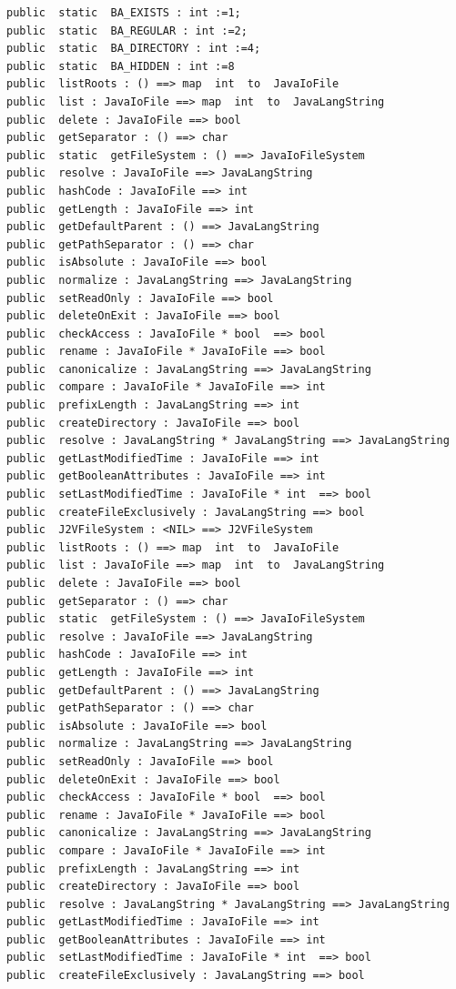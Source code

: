 \documentclass[\pformat,12pt]{article}
\begin{document}
\begin{small}
\begin{verbatim}
public  static  BA_EXISTS : int :=1;
public  static  BA_REGULAR : int :=2;
public  static  BA_DIRECTORY : int :=4;
public  static  BA_HIDDEN : int :=8
public  listRoots : () ==> map  int  to  JavaIoFile
public  list : JavaIoFile ==> map  int  to  JavaLangString
public  delete : JavaIoFile ==> bool
public  getSeparator : () ==> char
public  static  getFileSystem : () ==> JavaIoFileSystem
public  resolve : JavaIoFile ==> JavaLangString
public  hashCode : JavaIoFile ==> int
public  getLength : JavaIoFile ==> int
public  getDefaultParent : () ==> JavaLangString
public  getPathSeparator : () ==> char
public  isAbsolute : JavaIoFile ==> bool
public  normalize : JavaLangString ==> JavaLangString
public  setReadOnly : JavaIoFile ==> bool
public  deleteOnExit : JavaIoFile ==> bool
public  checkAccess : JavaIoFile * bool  ==> bool
public  rename : JavaIoFile * JavaIoFile ==> bool
public  canonicalize : JavaLangString ==> JavaLangString
public  compare : JavaIoFile * JavaIoFile ==> int
public  prefixLength : JavaLangString ==> int
public  createDirectory : JavaIoFile ==> bool
public  resolve : JavaLangString * JavaLangString ==> JavaLangString
public  getLastModifiedTime : JavaIoFile ==> int
public  getBooleanAttributes : JavaIoFile ==> int
public  setLastModifiedTime : JavaIoFile * int  ==> bool
public  createFileExclusively : JavaLangString ==> bool
public  J2VFileSystem : <NIL> ==> J2VFileSystem
public  listRoots : () ==> map  int  to  JavaIoFile
public  list : JavaIoFile ==> map  int  to  JavaLangString
public  delete : JavaIoFile ==> bool
public  getSeparator : () ==> char
public  static  getFileSystem : () ==> JavaIoFileSystem
public  resolve : JavaIoFile ==> JavaLangString
public  hashCode : JavaIoFile ==> int
public  getLength : JavaIoFile ==> int
public  getDefaultParent : () ==> JavaLangString
public  getPathSeparator : () ==> char
public  isAbsolute : JavaIoFile ==> bool
public  normalize : JavaLangString ==> JavaLangString
public  setReadOnly : JavaIoFile ==> bool
public  deleteOnExit : JavaIoFile ==> bool
public  checkAccess : JavaIoFile * bool  ==> bool
public  rename : JavaIoFile * JavaIoFile ==> bool
public  canonicalize : JavaLangString ==> JavaLangString
public  compare : JavaIoFile * JavaIoFile ==> int
public  prefixLength : JavaLangString ==> int
public  createDirectory : JavaIoFile ==> bool
public  resolve : JavaLangString * JavaLangString ==> JavaLangString
public  getLastModifiedTime : JavaIoFile ==> int
public  getBooleanAttributes : JavaIoFile ==> int
public  setLastModifiedTime : JavaIoFile * int  ==> bool
public  createFileExclusively : JavaLangString ==> bool
\end{verbatim}
\end{small}
\end{document}
